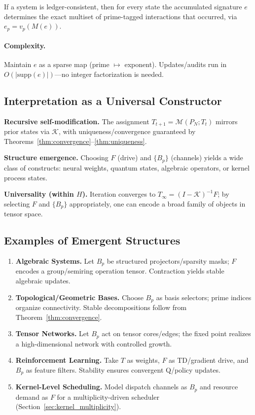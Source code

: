 \documentclass[11pt]{article}
\theoremstyle{definition}
\theoremstyle{remark}
\newcommand{\1}{\mathbf{1}}
\begin{document}
\begin{proposition}
If a system is ledger-consistent, then for every state the accumulated signature $e$ determines the exact multiset of prime-tagged interactions that occurred, via $e_p=v_p(M(e))$.
\end{proposition}

\paragraph{Complexity.}
Maintain $e$ as a sparse map (prime $\mapsto$ exponent). Updates/audits run in $O(|\mathrm{supp}(e)|)$—no integer factorization is needed.

\subsection{Interpretation as a Universal Constructor}
\label{subsec:universal_constructor}
\textbf{Recursive self-modification.} The assignment $T_{t+1}=\mathcal{M}(P_N;T_t)$ mirrors prior states via $\mathcal{K}$, with uniqueness/convergence guaranteed by Theorems~\ref{thm:convergence}–\ref{thm:uniqueness}.

\textbf{Structure emergence.} Choosing $F$ (drive) and $\{B_p\}$ (channels) yields a wide class of constructs: neural weights, quantum states, algebraic operators, or kernel process states.

\textbf{Universality (within $H$).} Iteration converges to $T_\infty=(I-\mathcal{K})^{-1}F$; by selecting $F$ and $\{B_p\}$ appropriately, one can encode a broad family of objects in tensor space.

\subsection{Examples of Emergent Structures}
\begin{enumerate}
  \item \textbf{Algebraic Systems.} Let $B_p$ be structured projectors/sparsity masks; $F$ encodes a group/semiring operation tensor. Contraction yields stable algebraic updates.
  \item \textbf{Topological/Geometric Bases.} Choose $B_p$ as basis selectors; prime indices organize connectivity. Stable decompositions follow from Theorem~\ref{thm:convergence}.
  \item \textbf{Tensor Networks.} Let $B_p$ act on tensor cores/edges; the fixed point realizes a high-dimensional network with controlled growth.
  \item \textbf{Reinforcement Learning.} Take $T$ as weights, $F$ as TD/gradient drive, and $B_p$ as feature filters. Stability ensures convergent Q/policy updates.
  \item \textbf{Kernel-Level Scheduling.} Model dispatch channels as $B_p$ and resource demand as $F$ for a multiplicity-driven scheduler (Section~\ref{sec:kernel_multiplicity}).
\end{enumerate}
\end{document}
